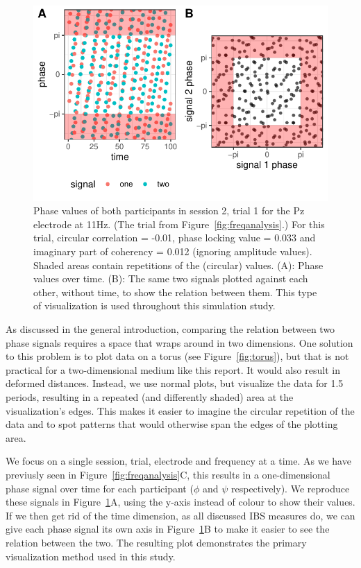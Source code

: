 \begin{figure}[!htpb]
  \includegraphics[width=\linewidth]{../stats/results/phases-visualization.pdf}
  \caption{Phase values of both participants in session 2, trial 1 for the Pz electrode at 11Hz. (The trial from Figure~\ref{fig:freqanalysis}.) For this trial, circular correlation = -0.01, phase locking value = 0.033 and imaginary part of coherency = 0.012 (ignoring amplitude values). Shaded areas contain repetitions of the (circular) values. (A): Phase values over time. (B): The same two signals plotted against each other, without time, to show the relation between them. This type of visualization is used throughout this simulation study.}
  \label{fig:phases-visualization}
\end{figure}

As discussed in the general introduction, comparing the relation between two
phase signals requires a space that wraps around in two dimensions. One solution
to this problem is to plot data on a torus (see Figure~\ref{fig:torus}), but
that is not practical for a two-dimensional medium like this report. It would
also result in deformed distances. Instead, we use normal plots, but visualize
the data for 1.5 periods, resulting in a repeated (and differently shaded) area
at the visualization's edges. This makes it easier to imagine the circular
repetition of the data and to spot patterns that would otherwise span the edges
of the plotting area.

We focus on a single session, trial, electrode and frequency at a time. As we
have previusly seen in Figure~\ref{fig:freqanalysis}C, this results in a
one-dimensional phase signal over time for each participant ($\phi$ and $\psi$
respectively). We reproduce these signals in
Figure~\ref{fig:phases-visualization}A, using the y-axis instead of colour to
show their values. If we then get rid of the time dimension, as all discussed
IBS measures do, we can give each phase signal its own axis in
Figure~\ref{fig:phases-visualization}B to make it easier to see the relation
between the two. The resulting plot demonstrates the primary visualization
method used in this study.

